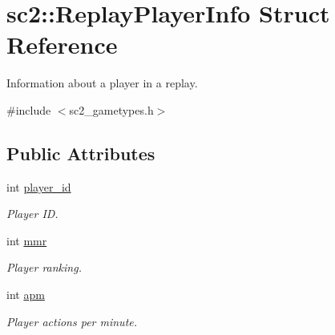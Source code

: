 \hypertarget{structsc2_1_1_replay_player_info}{}\section{sc2\+:\+:Replay\+Player\+Info Struct Reference}
\label{structsc2_1_1_replay_player_info}


Information about a player in a replay.  




{\ttfamily \#include $<$sc2\+\_\+gametypes.\+h$>$}

\subsection*{Public Attributes}
\begin{DoxyCompactItemize}
\item 
\mbox{\label{structsc2_1_1_replay_player_info_a0a10ff4668dd1d3b017ff5d4da1837fc}} 
int \hyperlink{structsc2_1_1_replay_player_info_a0a10ff4668dd1d3b017ff5d4da1837fc}{player\+\_\+id}
\begin{DoxyCompactList}\small\item\em Player ID. \end{DoxyCompactList}\item 
\mbox{\label{structsc2_1_1_replay_player_info_a0a1d671f0ad7727dcb2c9b4b4a2b9314}} 
int \hyperlink{structsc2_1_1_replay_player_info_a0a1d671f0ad7727dcb2c9b4b4a2b9314}{mmr}
\begin{DoxyCompactList}\small\item\em Player ranking. \end{DoxyCompactList}\item 
\mbox{\label{structsc2_1_1_replay_player_info_aa9bd56433e96284ccf0b5107e03b1cf3}} 
int \hyperlink{structsc2_1_1_replay_player_info_aa9bd56433e96284ccf0b5107e03b1cf3}{apm}
\begin{DoxyCompactList}\small\item\em Player actions per minute. \end{DoxyCompactList}\item 
\mbox{\label{structsc2_1_1_replay_player_info_a4ab3c2d0a8d9d784be2404c671f1d143}} 

\end{DoxyCompactItemize}
